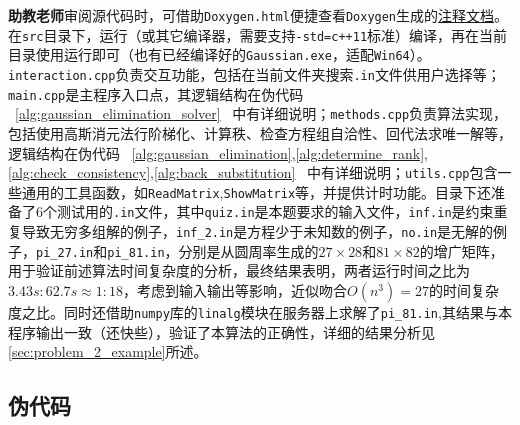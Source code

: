 \noindent \textbf{助教老师}审阅源代码时，可借助\texttt{Doxygen.html}便捷查看\texttt{Doxygen}生成的\href{https://bud-primordium.github.io/Computational-Physics-Fall-2024/Assignment_3/Problem_2/doxygen_output/html/index.html}{注释文档}。在\texttt{src}目录下，运行（或其它编译器，需要支持\texttt{-std=c++11}标准）编译，再在当前目录使用运行即可（也有已经编译好的\texttt{Gaussian.exe}，适配\texttt{Win64}）。\texttt{interaction.cpp}负责交互功能，包括在当前文件夹搜索\texttt{.in}文件供用户选择等；\texttt{main.cpp}是主程序入口点，其逻辑结构在伪代码 \ \ref{alg:gaussian_elimination_solver} \ 中有详细说明；\texttt{methods.cpp}负责算法实现，包括使用高斯消元法行阶梯化、计算秩、检查方程组自洽性、回代法求唯一解等，逻辑结构在伪代码 \ \ref{alg:gaussian_elimination},\ref{alg:determine_rank},\ref{alg:check_consistency},\ref{alg:back_substitution} \ 中有详细说明；\texttt{utils.cpp}包含一些通用的工具函数，如\texttt{ReadMatrix},\texttt{ShowMatrix}等，并提供计时功能。目录下还准备了$6$个测试用的\texttt{.in}文件，其中\texttt{quiz.in}是本题要求的输入文件，\texttt{inf.in}是约束重复导致无穷多组解的例子，\texttt{inf\_2.in}是方程少于未知数的例子，\texttt{no.in}是无解的例子，\texttt{pi\_27.in}和\texttt{pi\_81.in}，分别是从圆周率生成的$27\times28$和$81\times82$的增广矩阵，用于验证前述算法时间复杂度的分析，最终结果表明，两者运行时间之比为$3.43s:62.7s  \approx 1:18$，考虑到输入输出等影响，近似吻合$O(n^3)=27$的时间复杂度之比。同时还借助\texttt{numpy}库的\texttt{linalg}模块在服务器上求解了\texttt{pi\_81.in},其结果与本程序输出一致（还快些），验证了本算法的正确性，详细的结果分析见\ref{sec:problem_2_example}所述。

\subsection{伪代码}

